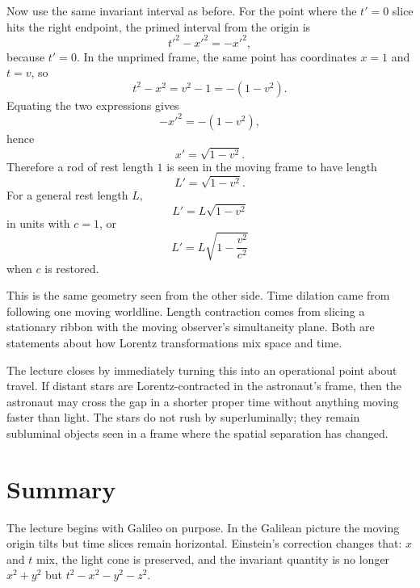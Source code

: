 Now use the same invariant interval as before. For the point where the \(t'=0\) slice hits the right endpoint, the primed interval from the origin is
\begin{equation}
t'^2-x'^2 = -x'^2,
\end{equation}
because \(t'=0\). In the unprimed frame, the same point has coordinates \(x=1\) and \(t=v\), so
\begin{equation}
t^2-x^2 = v^2-1 = -(1-v^2).
\end{equation}
Equating the two expressions gives
\begin{equation}
-x'^2 = -(1-v^2),
\end{equation}
hence
\begin{equation}
x'=\sqrt{1-v^2}.
\end{equation}
Therefore a rod of rest length \(1\) is seen in the moving frame to have length
\begin{equation}
L'=\sqrt{1-v^2}.
\end{equation}
For a general rest length \(L\),
\begin{equation}
L' = L\sqrt{1-v^2}
\end{equation}
in units with \(c=1\), or
\begin{equation}
L' = L\sqrt{1-\frac{v^2}{c^2}}
\end{equation}
when \(c\) is restored.

This is the same geometry seen from the other side. Time dilation came from following one moving worldline. Length contraction comes from slicing a stationary ribbon with the moving observer's simultaneity plane. Both are statements about how Lorentz transformations mix space and time.

The lecture closes by immediately turning this into an operational point about travel. If distant stars are Lorentz-contracted in the astronaut's frame, then the astronaut may cross the gap in a shorter proper time without anything moving faster than light. The stars do not rush by superluminally; they remain subluminal objects seen in a frame where the spatial separation has changed.

\section{Summary}

The lecture begins with Galileo on purpose. In the Galilean picture the moving origin tilts but time slices remain horizontal. Einstein's correction changes that: \(x\) and \(t\) mix, the light cone is preserved, and the invariant quantity is no longer \(x^2+y^2\) but \(t^2-x^2-y^2-z^2\).

